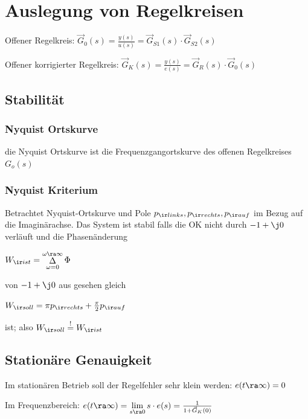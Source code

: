 \documentclass[fs, german]{latex4ei_fs}
\begin{document}
\section{Auslegung von Regelkreisen}
\begin{sectionbox}
Offener Regelkreis: $\vec G_0 (s) = \frac{y(s)}{u(s)} = \vec G_{S1} (s) \cdot \vec G_{S2} (s)$

Offener korrigierter Regelkreis: $\vec G_K (s) = \frac{y(s)}{e(s)} = \vec G_R (s) \cdot \vec G_0 (s)$

\subsection{Stabilität}

\subsubsection{Nyquist Ortskurve}
	
	die Nyquist Ortskurve ist die Frequenzgangortskurve des offenen Regelkreises $G_o (s)$ 
	
	\subsubsection{Nyquist Kriterium}
	
	Betrachtet Nyquist-Ortskurve und Pole $p_{\ir links}, p_{\ir rechts}, p_{\ir auf}$ im Bezug auf die Imaginärachse.
	Das System ist stabil falls die OK nicht durch $-1 + \j 0$ verläuft und die Phasenänderung \\
	
	\begin{emphbox}
	$W_{\ir ist} = \mathop{\Delta}\limits_{\omega = 0}^{\omega \ra \infty} \Phi$
	\end{emphbox}
	
	von $-1 + \j 0$ aus gesehen gleich \\
	
		\begin{emphbox}
		$W_{\ir soll} = \pi p_{\ir rechts} + \frac{\pi}{2} p_{\ir auf}$
		\end{emphbox}
	ist; also $W_{\ir soll} \stackrel{!}{=} W_{\ir ist}$ 
\end{sectionbox}

\begin{sectionbox}

\subsection{Stationäre Genauigkeit} 

Im stationären Betrieb soll der Regelfehler sehr klein werden:
$e (t \ra \infty) = 0$

Im Frequenzbereich:
$e (t \ra \infty) = \lim \limits_{s \ra 0} s \cdot e(s) = \frac{1}{1 + \vec G_K (0)}$
\end{sectionbox}
\end{document}
